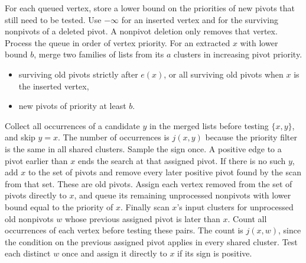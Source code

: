 \documentclass[11pt]{article}
\begin{document}
For each queued vertex, store a lower bound on the priorities of new
pivots that still need to be tested. Use $-\infty$ for an inserted
vertex and for the surviving nonpivots of a deleted pivot. A
nonpivot deletion only removes that vertex. Process the queue in order
of vertex priority. For an extracted $x$ with lower bound $b$,
merge two families of lists from its $a$ clusters in increasing pivot
priority.
\begin{itemize}
\item surviving old pivots strictly after $e(x)$, or all surviving old
pivots when $x$ is the inserted vertex,
\item new pivots of priority at least $b$.
\end{itemize}
Collect all occurrences of a candidate $y$ in the merged lists
before testing $\{x,y\}$, and skip $y=x$. The number of occurrences
is $j(x,y)$ because the priority filter is the same in all shared
clusters. Sample the sign once. A positive edge to a pivot earlier
than $x$ ends the search at that assigned pivot. If there is no such $y$, add $x$ to the
set of pivots and remove every later positive pivot
found by the scan from that set.
These are old pivots. Assign each vertex removed from the set of pivots directly to $x$, and
queue its remaining unprocessed nonpivots with lower bound equal to the
priority of $x$. Finally scan $x$'s input clusters for unprocessed old nonpivots $w$ whose
previous assigned pivot is later than $x$. Count all occurrences of each vertex
before testing these pairs. The count is $j(x,w)$, since the condition on the previous
assigned pivot applies in every shared cluster. Test each distinct $w$ once
and assign it directly to $x$ if its sign is positive.
\end{document}
